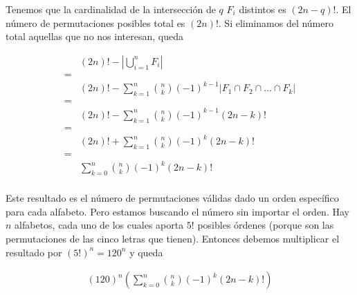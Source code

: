\documentclass{article}
\begin{document}
Tenemos que la cardinalidad de la intersección de $q$ $F_i$ distintos es
$(2n-q)!$. El número de permutaciones posibles total es $(2n)!$. Si eliminamos
del número total aquellas que no nos interesan, queda

\begin{align*}
& (2n)! - \left| \bigcup_{i=1}^n F_i \right| \\
= & \\
& (2n)! - \sum_{k=1}^n \binom{n}{k} (-1)^{k-1} |F_1 \cap F_2 \cap \ldots \cap F_k| \\
= & \\
& (2n)! - \sum_{k=1}^n \binom{n}{k} (-1)^{k-1} (2n-k)! \\
= & \\
& (2n)! + \sum_{k=1}^n \binom{n}{k} (-1)^{k} (2n-k)! \\
= & \\
& \sum_{k=0}^n \binom{n}{k} (-1)^{k} (2n-k)! \\
\end{align*}

Este resultado es el número de permutaciones válidas dado un orden específico
para cada alfabeto. Pero estamos buscando el número sin importar el orden. Hay
$n$ alfabetos, cada uno de los cuales aporta $5!$ posibles órdenes
(porque son las permutaciones de las cinco letras que tienen). Entonces debemos
multiplicar el resultado por $(5!)^n = 120^n$ y queda

\begin{align*}
(120)^n (\sum_{k=0}^n \binom{n}{k} (-1)^{k} (2n-k)!) \\
\end{align*}

\section{}
\end{document}
